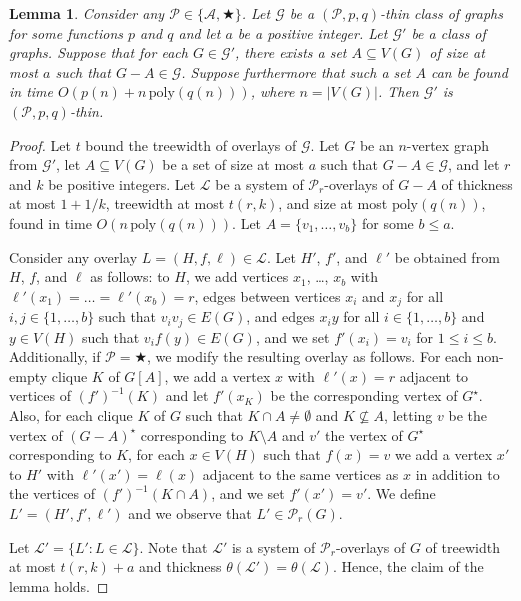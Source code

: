 \documentclass[a4paper,11pt]{article}
\newcommand{\Aa}{{\mathcal A}}
\newcommand{\GG}{{\mathcal G}}
\newcommand{\LL}{{\mathcal L}}
\newcommand{\PP}{{\mathcal P}}
\newcommand{\poly}{\text{poly}}
\newtheorem{lemma}[theorem]{Lemma}
\begin{document}
\begin{lemma}\label{lemma-apex}
Consider any $\PP\in\{\Aa,\bigstar\}$.
Let $\GG$ be a $(\PP,p,q)$-thin class of graphs for some functions $p$ and $q$ and let $a$ be a positive integer.
Let $\GG'$ be a class of graphs.  Suppose that for each $G\in\GG'$, there exists a set $A\subseteq V(G)$ of size at most $a$
such that $G-A\in\GG$.  Suppose furthermore that such a set $A$ can be found in time $O(p(n)+n\,\poly(q(n)))$, where $n=|V(G)|$.
Then $\GG'$ is $(\PP,p,q)$-thin.
\end{lemma}
\begin{proof}
Let $t$ bound the treewidth of overlays of $\GG$.
Let $G$ be an $n$-vertex graph from $\GG'$, let $A\subseteq V(G)$ be a set of size at most $a$
such that $G-A\in\GG$, and let $r$ and $k$ be positive integers.
Let $\LL$ be a system of $\PP_r$-overlays of $G-A$ of thickness at most $1+1/k$, treewidth at most $t(r,k)$, and size
at most $\poly(q(n))$, found in time $O(n\,\poly(q(n)))$.  Let $A=\{v_1,\ldots,v_b\}$ for some $b\le a$.

Consider any overlay $L=(H,f,\ell)\in\LL$.
Let $H'$, $f'$, and $\ell'$ be obtained from $H$, $f$, and $\ell$ as follows: to $H$, we add vertices $x_1$, \ldots, $x_b$ with $\ell'(x_1)=\ldots=\ell'(x_b)=r$,
edges between vertices $x_i$ and $x_j$ for all $i,j\in\{1,\ldots, b\}$
such that $v_iv_j\in E(G)$, and edges $x_iy$ for all $i\in \{1,\ldots,b\}$ and $y\in V(H)$ such that $v_if(y)\in E(G)$, and we set $f'(x_i)=v_i$ for $1\le i\le b$.
Additionally, if $\PP=\bigstar$, we modify the resulting overlay as follows.  For each non-empty clique $K$ of $G[A]$, we add a vertex $x$ with $\ell'(x)=r$ adjacent to vertices of $(f')^{-1}(K)$ and let $f'(x_K)$ be the corresponding vertex of $G^\star$.
Also, for each clique $K$ of $G$ such that $K\cap A\neq\emptyset$ and $K\not\subseteq A$, letting $v$ be the vertex of $(G-A)^\star$ corresponding to $K\setminus A$ and $v'$ the vertex of $G^\star$ corresponding
to $K$, for each $x\in V(H)$ such that $f(x)=v$ we add a vertex $x'$ to $H'$ with $\ell'(x')=\ell(x)$ adjacent to the same vertices as $x$ in addition to the vertices of
$(f')^{-1}(K\cap A)$, and we set $f'(x')=v'$.  We define $L'=(H',f',\ell')$ and we observe that $L'\in\PP_r(G)$.

Let $\LL'=\{L':L\in\LL\}$.  Note that $\LL'$ is a system of $\PP_r$-overlays of $G$ of treewidth at most $t(r,k)+a$ and thickness $\theta(\LL')=\theta(\LL)$.
Hence, the claim of the lemma holds.
\end{proof}
\end{document}
